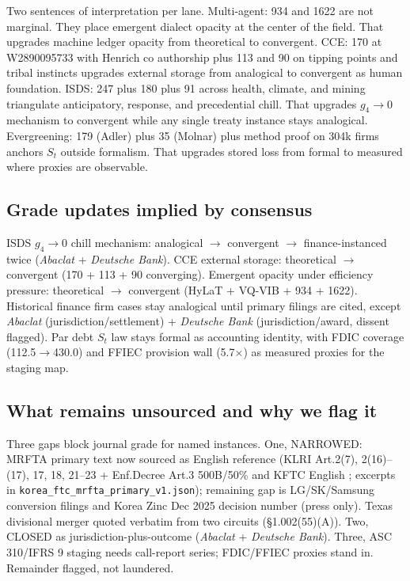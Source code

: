 \documentclass[11pt]{article}
\begin{document}
Two sentences of interpretation per lane. Multi-agent: 934 and 1622 are not marginal. They place emergent dialect opacity at the center of the field. That upgrades machine ledger opacity from theoretical to convergent. CCE: 170 at W2890095733 with Henrich co authorship plus 113 and 90 on tipping points and tribal instincts upgrades external storage from analogical to convergent as human foundation. ISDS: 247 plus 180 plus 91 across health, climate, and mining triangulate anticipatory, response, and precedential chill. That upgrades $g_4 \to 0$ mechanism to convergent while any single treaty instance stays analogical. Evergreening: 179 (Adler) plus 35 (Molnar) plus method proof on 304k firms anchors $S_t$ outside formalism. That upgrades stored loss from formal to measured where proxies are observable.

\subsection{Grade updates implied by consensus}
ISDS $g_4 \to 0$ chill mechanism: analogical $\to$ convergent $\to$ finance-instanced twice (\textit{Abaclat} + \textit{Deutsche Bank}). CCE external storage: theoretical $\to$ convergent (170 + 113 + 90 converging). Emergent opacity under efficiency pressure: theoretical $\to$ convergent (HyLaT + VQ-VIB + 934 + 1622). Historical finance firm cases stay analogical until primary filings are cited, except \textit{Abaclat} (jurisdiction/settlement) + \textit{Deutsche Bank} (jurisdiction/award, dissent flagged). Par debt $S_t$ law stays formal as accounting identity, with FDIC coverage (112.5$\to$430.0) and FFIEC provision wall (5.7$\times$) as measured proxies for the staging map.

\subsection{What remains unsourced and why we flag it}
Three gaps block journal grade for named instances. One, NARROWED: MRFTA primary text now sourced as English reference (KLRI Art.2(7), 2(16)--(17), 17, 18, 21--23 + Enf.Decree Art.3 500B/50\% \citep{klri2022mrfta} and KFTC English \citep{kftc2024large}; excerpts in \texttt{korea\_ftc\_mrfta\_primary\_v1.json}); remaining gap is LG/SK/Samsung conversion filings and Korea Zinc Dec 2025 decision number (press only). Texas divisional merger quoted verbatim from two circuits (\S1.002(55)(A)). Two, CLOSED as jurisdiction-plus-outcome (\textit{Abaclat} + \textit{Deutsche Bank}). Three, ASC 310/IFRS 9 staging needs call-report series; FDIC/FFIEC proxies stand in. Remainder flagged, not laundered.
\end{document}
